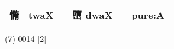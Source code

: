 \documentclass[14pt,a4paper]{scrartcl}
\begin{document}
\begin{longtable}[c]{@{}llllll@{}}
\begin{minipage}[t]{0.14\columnwidth}\raggedright\strut
憜
\strut\end{minipage} &
\begin{minipage}[t]{0.14\columnwidth}\raggedright\strut
twaX
\strut\end{minipage} &
\begin{minipage}[t]{0.14\columnwidth}\raggedright\strut
\strut\end{minipage} &
\begin{minipage}[t]{0.14\columnwidth}\raggedright\strut
嶞 dwaX
\strut\end{minipage} &
\begin{minipage}[t]{0.14\columnwidth}\raggedright\strut
\strut\end{minipage} &
\begin{minipage}[t]{0.14\columnwidth}\raggedright\strut
pure:A
\strut\end{minipage}\tabularnewline
\bottomrule
\end{longtable}

(7) 0014 {[}2{]}
\end{document}
